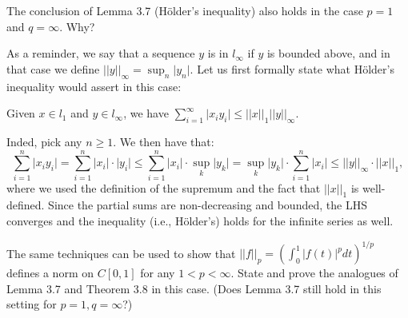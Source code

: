 \begin{exercise}{24}
    The conclusion of Lemma 3.7 (Hölder's inequality) also holds in the case $p = 1$ and $q = \infty$.
    Why?
\end{exercise}

\begin{solution}
    
    As a reminder, we say that a sequence $y$ is in $l_{\infty}$ if $y$ is bounded above, and in that case we define $\lvert \lvert y \rvert \rvert_{\infty} = \sup_{n} \lvert y_n \rvert$. 
    Let us first formally state what Hölder's inequality would assert in this case:

    Given $x \in l_1$ and $y \in l_{\infty}$, we have $\sum_{i=1}^{\infty} \lvert x_i y_i \rvert \leq \lvert \lvert x \rvert \rvert_1 \lvert \lvert y \rvert \rvert_{\infty}$.

    Inded, pick any $n \geq 1$.
    We then have that:
    $$\sum_{i=1}^{n} \lvert x_i y_i \rvert = \sum_{i=1}^{n} \lvert x_i \rvert \cdot \lvert y_i \rvert \leq \sum_{i=1}^{n} \lvert x_i \rvert \cdot \sup_{k} \lvert y_k \rvert = \sup_{k} \lvert y_k \rvert \cdot \sum_{i=1}^{n} \lvert x_i \rvert \leq \lvert \lvert y \rvert \rvert_{\infty} \cdot \lvert \lvert x \rvert \rvert_1,$$
    where we used the definition of the supremum and the fact that $\lvert \lvert x \rvert \rvert_1$ is well-defined.
    Since the partial sums are non-decreasing and bounded, the LHS converges and the inequality (i.e., Hölder's) holds for the infinite series as well.
\end{solution}

\begin{exercise}{25}
    The same techniques can be used to show that $\lvert \lvert f \rvert \rvert_p = (\int_{0}^{1} \lvert f(t) \rvert^p dt)^{1/p}$ defines a norm on $C[0, 1]$ for any $1 < p < \infty$.
    State and prove the analogues of Lemma 3.7 and Theorem 3.8 in this case.
    (Does Lemma 3.7 still hold in this setting for $p = 1, q = \infty$?)
\end{exercise}


